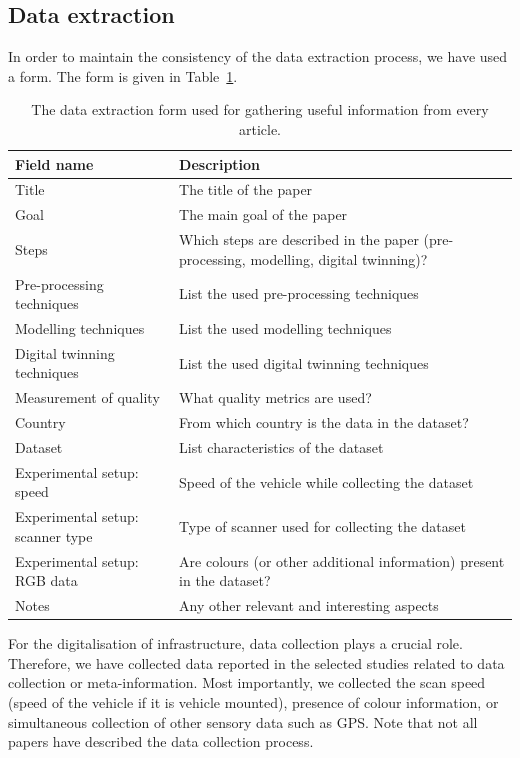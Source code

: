 \subsection{Data extraction} %
In order to maintain the consistency of the data extraction process, we have used a form. The form is given in Table~\ref{tab:stoa:data-extraction}.
\begin{table}
    \centering
    \begin{tabular}{p{3.58cm}p{7.58cm}} %
         \toprule
         \textbf{Field name} & \textbf{Description} \\
         \midrule
         Title & The title of the paper \\
         \addlinespace
         Goal & The main goal of the paper\\
         \addlinespace
         Steps & Which steps are described in the paper (pre-processing, modelling, digital twinning)? \\
         \addlinespace
         Pre-processing techniques & List the used pre-processing techniques \\
         \addlinespace
         Modelling techniques & List the used modelling techniques \\
         \addlinespace
         Digital twinning techniques & List the used digital twinning techniques \\
         \addlinespace
         Measurement of quality & What quality metrics are used? \\
         \addlinespace
         Country & From which country is the data in the dataset? \\
         \addlinespace
         Dataset & List characteristics of the dataset \\
         \addlinespace
         Experimental setup: speed & Speed of the vehicle while collecting the dataset\\
         \addlinespace
         Experimental setup: scanner type & Type of scanner used for collecting the dataset\\
         \addlinespace
         Experimental setup: RGB data & Are colours (or other additional information) present in the dataset?\\
         \addlinespace
         Notes & Any other relevant and interesting aspects\\
         \bottomrule
    \end{tabular}
    \caption{The data extraction form used for gathering useful information from every article.}
    \label{tab:stoa:data-extraction}
\end{table}
For the digitalisation of infrastructure, data collection plays a crucial role. Therefore, we have collected data reported in the selected studies related to data collection or meta-information. Most importantly, we collected the scan speed (speed of the vehicle if it is vehicle mounted), presence of colour information, or simultaneous collection of other sensory data such as GPS. Note that not all papers have described the data collection process. 

